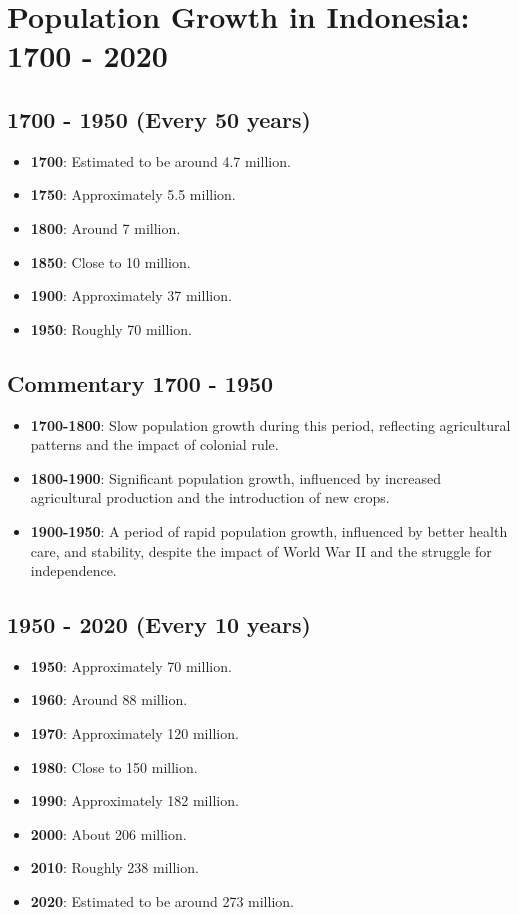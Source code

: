 \section*{Population Growth in Indonesia: 1700 - 2020}

\subsection*{1700 - 1950 (Every 50 years)}
\begin{itemize}
    \item \textbf{1700}: Estimated to be around 4.7 million.
    \item \textbf{1750}: Approximately 5.5 million.
    \item \textbf{1800}: Around 7 million.
    \item \textbf{1850}: Close to 10 million.
    \item \textbf{1900}: Approximately 37 million.
    \item \textbf{1950}: Roughly 70 million.
\end{itemize}

\subsection*{Commentary 1700 - 1950}
\begin{itemize}
    \item \textbf{1700-1800}: Slow population growth during this period, reflecting agricultural patterns and the impact of colonial rule.
    \item \textbf{1800-1900}: Significant population growth, influenced by increased agricultural production and the introduction of new crops.
    \item \textbf{1900-1950}: A period of rapid population growth, influenced by better health care, and stability, despite the impact of World War II and the struggle for independence.
\end{itemize}

\subsection*{1950 - 2020 (Every 10 years)}
\begin{itemize}
    \item \textbf{1950}: Approximately 70 million.
    \item \textbf{1960}: Around 88 million.
    \item \textbf{1970}: Approximately 120 million.
    \item \textbf{1980}: Close to 150 million.
    \item \textbf{1990}: Approximately 182 million.
    \item \textbf{2000}: About 206 million.
    \item \textbf{2010}: Roughly 238 million.
    \item \textbf{2020}: Estimated to be around 273 million.
\end{itemize}

